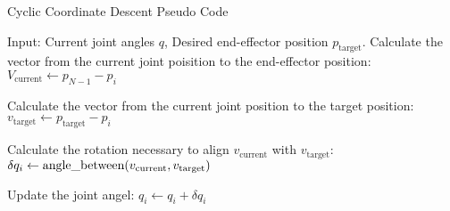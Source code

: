 \begin{algorithm}[p]
    \caption{Cyclic Coordinate Descent Pseudo Code}\label{alg:CCD}
    \begin{algorithmic}
        \State{} Input: Current joint angles $q$, Desired end-effector position $p_\text{target}$.
                \State{} Calculate the vector from the current joint poisition to the end-effector position:
                \State{} $V_\text{current} \leftarrow p_{N-1} - p_i$

                \State{} Calculate the vector from the current joint position to the target position:
                \State{} $v_\text{target} \leftarrow p_\text{target} - p_i$

                \State{} Calculate the rotation necessary to align $v_\text{current}$ with $v_\text{target}$:
                \State{} $\delta q_i \leftarrow \text{angle\textunderscore between}(v_\text{current}, v_\text{target})$

                \State{} Update the joint angel:
                \State{} $q_i \leftarrow q_i + \delta q_i$
            \EndFor{}
        \EndWhile{}
\end{algorithmic}
\end{algorithm}